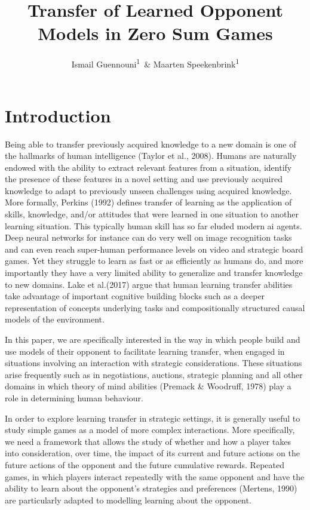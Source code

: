 \documentclass[man,floatsintext]{apa6}
\title{Transfer of Learned Opponent Models in Zero Sum Games}
\author{Ismail Guennouni\textsuperscript{1}~\& Maarten Speekenbrink\textsuperscript{1}}
\date{}
\begin{document}
\maketitle

\hypertarget{introduction}{%
\section{Introduction}\label{introduction}}

Being able to transfer previously acquired knowledge to a new domain is one of the hallmarks of human intelligence (Taylor et al., 2008). Humans are naturally endowed with the ability to extract relevant features from a situation, identify the presence of these features in a novel setting and use previously acquired knowledge to adapt to previously unseen challenges using acquired knowledge. More formally, Perkins (1992) defines transfer of learning as the application of skills, knowledge, and/or attitudes that were learned in one situation to another learning situation. This typically human skill has so far eluded modern ai agents. Deep neural networks for instance can do very well on image recognition tasks and can even reach super-human performance levels on video and strategic board games. Yet they struggle to learn as fast or as efficiently as humans do, and more importantly they have a very limited ability to generalize and transfer knowledge to new domains. Lake et al.(2017) argue that human learning transfer abilities take advantage of important cognitive building blocks such as a deeper representation of concepts underlying tasks and compositionally structured causal models of the environment.

In this paper, we are specifically interested in the way in which people build and use models of their opponent to facilitate learning transfer, when engaged in situations involving an interaction with strategic considerations. These situations arise frequently such as in negotiations, auctions, strategic planning and all other domains in which theory of mind abilities (Premack \& Woodruff, 1978) play a role in determining human behaviour.

In order to explore learning transfer in strategic settings, it is generally useful to study simple games as a model of more complex interactions. More specifically, we need a framework that allows the study of whether and how a player takes into consideration, over time, the impact of its current and future actions on the future actions of the opponent and the future cumulative rewards. Repeated games, in which players interact repeatedly with the same opponent and have the ability to learn about the opponent's strategies and preferences (Mertens, 1990) are particularly adapted to modelling learning about the opponent.
\end{document}
